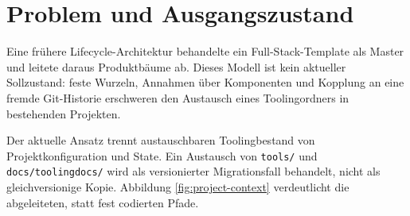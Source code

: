 \section{Problem und Ausgangszustand}
\label{chap:problem-initial-state}

Eine frühere Lifecycle-Architektur behandelte ein Full-Stack-Template als Master und
leitete daraus Produktbäume ab. Dieses Modell ist kein aktueller Sollzustand: feste
Wurzeln, Annahmen über Komponenten und Kopplung an eine fremde Git-Historie erschweren
den Austausch eines Toolingordners in bestehenden Projekten.

Der aktuelle Ansatz trennt austauschbaren Toolingbestand von Projektkonfiguration und
State. Ein Austausch von \texttt{tools/} und \texttt{docs/toolingdocs/} wird als
versionierter Migrationsfall behandelt, nicht als gleichversionige Kopie. Abbildung
\ref{fig:project-context} verdeutlicht die abgeleiteten, statt fest codierten Pfade.
